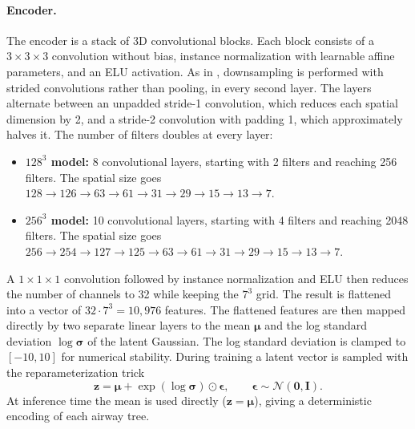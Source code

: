 \paragraph{Encoder.}                     %
The encoder is a stack of 3D convolutional blocks. Each block consists of a
$3\times3\times3$ convolution without bias, instance normalization with learnable affine
parameters, and an ELU activation. As in \citet{brock2016}, downsampling is
performed with strided convolutions rather than pooling, in every second layer. The layers
alternate between an unpadded stride-1 convolution, which reduces each spatial dimension by
2, and a stride-2 convolution with padding 1, which approximately halves it. The number of
filters doubles at every layer:
\begin{itemize}                          %
  \item \textbf{$128^3$ model:} 8 convolutional layers, starting with 2 filters and reaching
        256 filters. The spatial size goes
        $128 \to 126 \to 63 \to 61 \to 31 \to 29 \to 15 \to 13 \to 7$.
  \item \textbf{$256^3$ model:} 10 convolutional layers, starting with 4 filters and reaching
        2048 filters. The spatial size goes
        $256 \to 254 \to 127 \to 125 \to 63 \to 61 \to 31 \to 29 \to 15 \to 13 \to 7$.
\end{itemize}
A $1\times1\times1$ convolution followed by instance normalization and ELU then reduces the
number of channels to 32 while keeping the $7^3$ grid. The result is flattened into a vector
of $32 \cdot 7^3 = 10{,}976$ features. The flattened features are then mapped directly by two separate linear
layers to the mean $\boldsymbol{\mu}$ and the log standard deviation $\log\boldsymbol{\sigma}$
of the latent Gaussian. The log standard deviation is clamped to
$[-10, 10]$ for numerical stability. During training a latent vector is sampled with the reparameterization
trick
\begin{equation}
  \mathbf{z} = \boldsymbol{\mu} + \exp(\log\boldsymbol{\sigma}) \odot \boldsymbol{\epsilon},
  \qquad \boldsymbol{\epsilon} \sim \mathcal{N}(\mathbf{0}, \mathbf{I}).
  \label{eq:reparam}                     %
\end{equation}
At inference time the mean is used directly ($\mathbf{z} = \boldsymbol{\mu}$), giving a
deterministic encoding of each airway tree.

